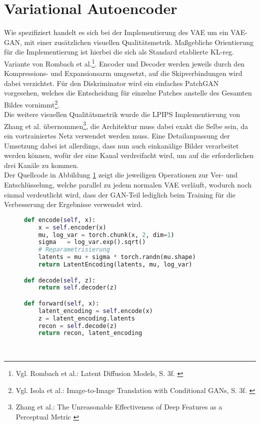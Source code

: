 \section {Variational Autoencoder}

Wie spezifiziert handelt es sich bei der Implementierung des VAE um ein VAE-GAN, mit einer zusätzlichen visuellen Qualitätsmetrik. Maßgebliche Orientierung für die Implementierung ist hierbei die sich als Standard etablierte KL-reg. Variante von Rombach et al.\footnote{
    Vgl. Rombach et al.: Latent Diffusion Models, S. 3f.
    \cite{rombach2022high}
}. Encoder und Decoder werden jeweils durch den Kompressions- und Expansionsarm umgesetzt, auf die Skipverbindungen wird dabei verzichtet. Für den Diskriminator wird ein einfaches PatchGAN vorgesehen, welches die Entscheidung für einzelne Patches anstelle des Gesamten Bildes vornimmt\footnote{
    Vgl. Isola et al.: Image-to-Image Translation with Conditional GANs, S. 3f.
    \cite{isola2018imagetoimagetranslationconditionaladversarial}
}. \\
Die weitere visuellen Qualitätsmetrik wurde die LPIPS Implementierung von Zhang et al. übernommen\footnote{
    Zhang et al.: The Unreasonable Effectiveness of Deep Features as a Perceptual Metric
    \cite{zhang2018unreasonableeffectivenessdeepfeatures}
}, die Architektur muss dabei exakt die Selbe sein, da ein vortrainiertes Netz verwendet werden muss. Eine Detailanpassung der Umsetzung dabei ist allerdings, dass nun auch einkanälige Bilder verarbeitet werden können, wofür der eine Kanal verdreifacht wird, um auf die erforderlichen drei Kanäle zu kommen. \\
Der Quellcode in Abbildung \ref{fig:vae_forward} zeigt die jeweiligen Operationen zur Ver- und Entschlüsselung, welche parallel zu jedem normalen VAE verläuft, wodurch noch einmal verdeutlicht wird, dass der GAN-Teil lediglich beim Training für die Verbesserung der Ergebnisse verwendet wird. 
\begin{figure}[htbp]
\begin{lstlisting}[language=python]
def encode(self, x):
    x = self.encoder(x)
    mu, log_var = torch.chunk(x, 2, dim=1) 
    sigma   = log_var.exp().sqrt()
    # Reparametrisierung
    latents = mu + sigma * torch.randn(mu.shape)
    return LatentEncoding(latents, mu, log_var)

def decode(self, z):
    return self.decoder(z)

def forward(self, x):
    latent_encoding = self.encode(x) 
    z = latent_encoding.latents
    recon = self.decode(z)
    return recon, latent_encoding
\end{lstlisting}
    \captionsetup{type=figure}
    \label{fig:vae_forward}
\end{figure} \\
